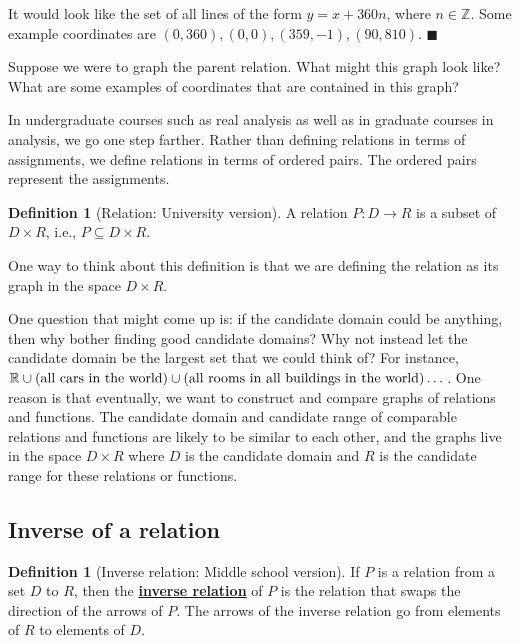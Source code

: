 \documentclass[11pt]{article}
\newenvironment{task}
	{\begin{mdframed}[linecolor=lightgray, linewidth=3pt]\raggedright}
	{\end{mdframed}}
\newcommand{\Z}{\mathbb{Z}}
\renewcommand\subset\subseteq
\renewcommand\emph[1]{\underline{\bf{#1}}} %
\theoremstyle{definition}
\newtheorem{definition}[theorem]{Definition}
\newenvironment{solution}{{\it Solution.} }{\hfill {\color{lightgray}$\blacksquare$}}
\begin{document}
\begin{solution}
It would look like the set of all lines of the form $y=x+360n$, where $n\in \Z$. Some example coordinates are $(0, 360), (0,0), (359, -1), (90, 810)$.
\end{solution}

\begin{task}
Suppose we were to graph the parent relation. What might this graph look like? What are some examples of coordinates that are contained in this graph?
\end{task}

In undergraduate courses such as real analysis as well as in graduate courses in analysis, we go one step farther. Rather than defining relations in terms of assignments, we define relations in terms of ordered pairs. The ordered pairs represent the assignments. 

\begin{definition}[Relation: University version]\label{d: relation university}
A relation $P:D\to R$ is a subset of $D\times R$, i.e., $P\subset D\times R$.
\end{definition}

One way to think about this definition is that we are defining the relation as its graph in the space $D\times R$. 

\begin{note}
One question that might come up is: if the candidate domain could be anything, then why bother finding good candidate domains? Why not instead let the candidate domain be the largest set that we could think of? For instance, $\mathbb{R}\cup (\textnormal{all cars in the world}) \cup(\textnormal{all rooms in all buildings in the world})\dots $. One reason is that eventually, we want to construct and compare graphs of relations and functions. The candidate domain and candidate range of comparable relations and functions are likely to be similar to each other, and the graphs live in the space $D\times R$ where $D$ is the candidate domain and $R$ is the candidate range for these relations or functions. \end{note}
\subsection{Inverse of a relation}

\begin{definition}[Inverse relation: Middle school version]\label{d: inverse relation middle school}
If $P$ is a relation from a set $D$ to $R$, then the \emph{inverse relation} of $P$ is the relation that swaps the direction of the arrows of $P$.  The arrows of the inverse relation go from elements of $R$ to elements of $D$.
\end{definition}
\end{document}
